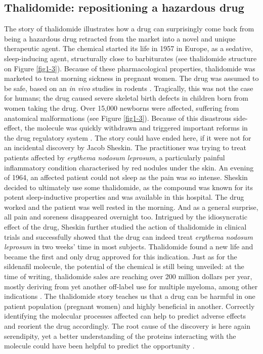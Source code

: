 \subsection{Thalidomide: repositioning a hazardous drug}

The story of thalidomide illustrates how a drug can surprisingly come back from being a hazardous drug retracted from the market into a novel and unique therapeutic agent. The chemical started its life in 1957 in Europe, as a sedative, sleep-inducing agent, structurally close to barbiturates (see thalidomide structure on Figure \ref{fig1-3}). Because of these pharmacological properties, thalidomide was marketed to treat morning sickness in pregnant women. The drug was assumed to be safe, based on an \emph{in vivo} studies in rodents \citep{stephens2009dark}. Tragically, this was not the case for humans; the drug caused severe skeletal birth defects in children born from women taking the drug. Over 15,000 newborns were affected, suffering from anatomical malformations (see Figure \ref{fig1-3}). Because of this disastrous side-effect, the molecule was quickly withdrawn and triggered important reforms in the drug regulatory system \citep{stephens2009dark}. The story could have ended here, if it were not for an incidental discovery by Jacob Sheskin. The practitioner was trying to treat patients affected by \emph{erythema nodosum leprosum}, a particularly painful inflammatory condition characterised by red nodules under the skin. An evening of 1964, an affected patient could not sleep as the pain was so intense. Sheskin decided to ultimately use some thalidomide, as the compound was known for its potent sleep-inductive properties and was available in this hospital. The drug worked and the patient was well rested in the morning. And as a general surprise, all pain and soreness disappeared overnight too. Intrigued by the idiosyncratic effect of the drug, Sheskin further studied the action of thalidomide in clinical trials \citep{barratt2012drug} and successfully showed that the drug can indeed treat \emph{erythema nodosum leprosum} in two weeks' time in most subjects. Thalidomide found a new life and became the first and only drug approved for this indication. Just as for the sildenafil molecule, the potential of the chemical is still being unveiled: at the time of writing, thalidomide sales are reaching over 200 million dollars per year, mostly deriving from yet another off-label use for multiple myeloma, among other indications \citep{ashburn2004drug}. The thalidomide story teaches us that a drug can be harmful in one patient population (pregnant women) and highly beneficial in another. Correctly identifying the molecular processes affected can help to predict adverse effects and reorient the drug accordingly. The root cause of the discovery is here again serendipity, yet a better understanding of the proteins interacting with the molecule could have been helpful to predict the opportunity \citep{sampaio1991thalidomide}.

